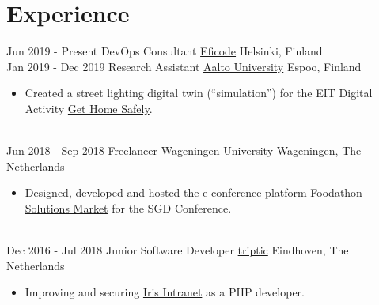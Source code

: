 \documentclass[a4paper]{twentysecondcv} %
\begin{document}


\section{Experience}
\begin{twentyshort} %
    \twentyitem
    	{Jun 2019 -}
		{Present}
        {DevOps Consultant}
		{\href{https://eficode.com}{Eficode}}
        {Helsinki, Finland}
        {%
        }
        \\
    \twentyitem
    	{Jan 2019 -}
		{Dec 2019}
        {Research Assistant}
		{\href{https://www.aalto.fi/en}{Aalto University}}
        {Espoo, Finland}
        {
        \begin{itemize}
			\item Created a street lighting digital twin (``simulation'') for the EIT Digital Activity \href{https://cyphylab.chora.tu-berlin.de/gethomesafely/}{Get Home Safely}.
        \end{itemize}
        }
        \\
    \twentyitem
    	{Jun 2018 -}
		{Sep 2018}
        {Freelancer}
		{\href{https://wur.nl/en}{Wageningen University}}
        {Wageningen, The Netherlands}
        {
        \begin{itemize}
			\item Designed, developed and hosted the e-conference platform \href{https://foodathon.github.io/}{Foodathon Solutions Market} for the SGD Conference.
        \end{itemize}
        }
        \\
    \twentyitem
    	{Dec 2016 -}
		{Jul 2018}
        {Junior Software Developer}
		{\href{https://www.triptic.nl/}{triptic}}
        {Eindhoven, The Netherlands}
        {
        \begin{itemize}
            \item Improving and securing \href{https://www.irisintranet.com/}{Iris Intranet} as a PHP developer.
        \end{itemize}
        }
\end{twentyshort}
\end{document}
